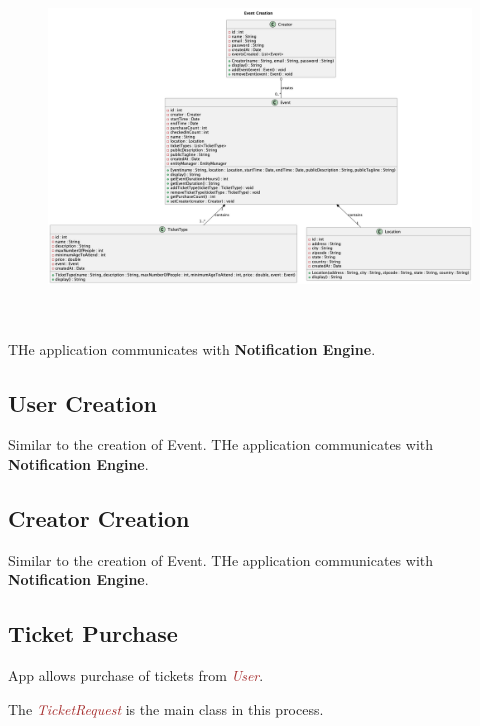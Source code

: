 \documentclass{article}
\newcommand{\designclass}[1]{\textit{\textcolor{brown}{#1}}}
\newcommand{\application}[1]{\textbf{\textcolor{codegreen}{#1}}}
\begin{document}
\begin{figure}[h]
    \centering
    \includegraphics[width=\textwidth, height=350px, keepaspectratio]{assets/uml/relations/EventCreation.png}
\end{figure}

THe application communicates with \application{Notification Engine}.

\subsection{User Creation}
Similar to the creation of Event. THe application communicates with \application{Notification Engine}.

\subsection{Creator Creation}
Similar to the creation of Event. THe application communicates with \application{Notification Engine}.

\FloatBarrier
\subsection{Ticket Purchase}
App allows purchase of tickets from \designclass{User}.

The \designclass{TicketRequest} is the main class in this process.
\end{document}
